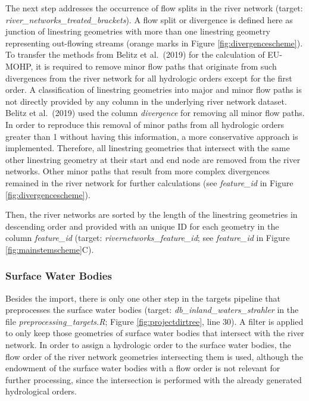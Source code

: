 \documentclass[fleqn,10pt]{wlscirep}
\begin{document}
The next step addresses the occurrence of flow splits in the river network (target: \emph{river\_networks\_treated\_brackets}). A flow split or divergence is defined here as junction of linestring geometries with more than one linestring geometry representing out-flowing streams (orange marks in Figure \ref{fig:divergencescheme}). To transfer the methods from Belitz et al.~(2019)\cite{belitz_multiorder_2019} for the calculation of EU-MOHP\cite{nolscher_eu-mohp_2021-1}, it is required to remove minor flow paths that originate from such divergences from the river network for all hydrologic orders except for the first order. A classification of linestring geometries into major and minor flow paths is not directly provided by any column in the underlying river network dataset. Belitz et al.~(2019)\cite{belitz_multiorder_2019} used the column \emph{divergence} for removing all minor flow paths. In order to reproduce this removal of minor paths from all hydrologic orders greater than 1 without having this information, a more conservative approach is implemented. Therefore, all linestring geometries that intersect with the same other linestring geometry at their start and end node are removed from the river networks. Other minor paths that result from more complex divergences remained in the river network for further calculations (see \emph{feature\_id} in Figure \ref{fig:divergencescheme}).

Then, the river networks are sorted by the length of the linestring geometries in descending order and provided with an unique ID for each geometry in the column \emph{feature\_id} (target: \emph{rivernetworks\_feature\_id}; see \emph{feature\_id} in Figure \ref{fig:mainstemscheme}C).

\hypertarget{surface-water-bodies}{%
\subsubsection*{Surface Water Bodies}\label{surface-water-bodies}}

Besides the import, there is only one other step in the targets pipeline that preprocesses the surface water bodies (target: \emph{db\_inland\_waters\_strahler} in the file \emph{preprocessing\_targets.R}; Figure \ref{fig:projectdirtree}, line 30). A filter is applied to only keep those geometries of surface water bodies that intersect with the river network. In order to assign a hydrologic order to the surface water bodies, the flow order of the river network geometries intersecting them is used, although the endowment of the surface water bodies with a flow order is not relevant for further processing, since the intersection is performed with the already generated hydrological orders.
\end{document}
